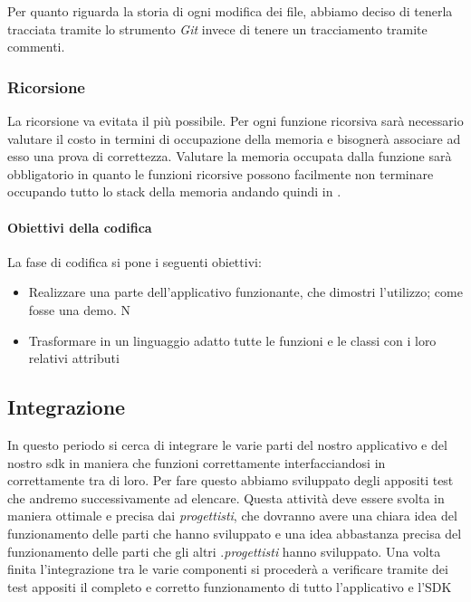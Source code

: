 Per quanto riguarda la storia di ogni modifica dei file, abbiamo deciso di tenerla tracciata tramite lo strumento \textit{Git} invece di tenere un tracciamento tramite commenti.

  
\subsubsection{Ricorsione}
La ricorsione va evitata il più possibile. Per ogni funzione ricorsiva sarà necessario valutare il costo in termini di occupazione della memoria e bisognerà associare ad esso una prova di correttezza.
Valutare la memoria occupata dalla funzione sarà obbligatorio in quanto le funzioni ricorsive possono facilmente non terminare occupando tutto lo stack della memoria andando quindi in .

\paragraph{Obiettivi della codifica}
La fase di codifica si pone i seguenti obiettivi:
\begin{itemize}
\item Realizzare una parte dell'applicativo funzionante, che dimostri l'utilizzo; come fosse una demo. N
\item Trasformare in un linguaggio adatto tutte le funzioni e le classi con i loro relativi attributi 
\end{itemize}

\subsection{Integrazione}
In questo periodo si cerca di integrare le varie parti del nostro applicativo e del nostro sdk in maniera che funzioni correttamente interfacciandosi in  correttamente tra di loro. Per fare questo abbiamo sviluppato degli appositi test che andremo successivamente ad elencare.
Questa attività deve essere svolta in maniera ottimale e precisa dai \textit{progettisti}, che dovranno avere una chiara idea del funzionamento delle parti che hanno sviluppato e una idea abbastanza precisa del funzionamento delle parti che gli altri .\textit{progettisti} hanno sviluppato. Una volta finita l'integrazione tra le varie componenti si procederà a verificare tramite dei test appositi il completo e corretto funzionamento di tutto l'applicativo e l'SDK

